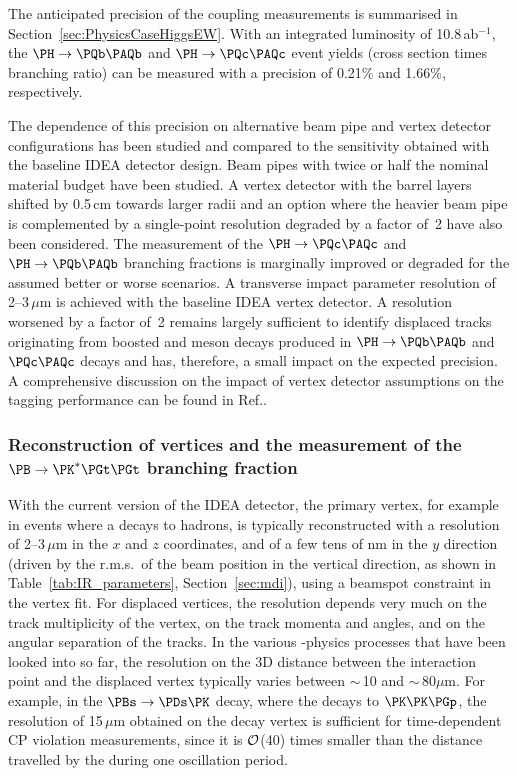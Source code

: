 The anticipated precision of the coupling measurements is summarised in Section~\ref{sec:PhysicsCaseHiggsEW}. 
With an integrated luminosity of 10.8\,ab$^{-1}$, the $\PH \to \PQb\PAQb$ and $\PH \to \PQc\PAQc$ event yields 
(cross section times branching ratio) 
can be measured with a precision of 0.21\% and 1.66\%, respectively.

The dependence of this precision on alternative beam pipe and vertex detector configurations 
has been studied and compared to the sensitivity obtained with the baseline IDEA detector design. 
Beam pipes with twice or half the nominal material budget have been studied. 
A vertex detector with the barrel layers shifted by 0.5\,cm towards larger radii 
and an option where the heavier beam pipe is complemented by a single-point resolution degraded by a factor of~2 
have also been considered. 
The measurement of the $\PH \to \PQc\PAQc$ and $\PH \to \PQb\PAQb$ branching fractions is marginally improved or degraded for the assumed better or worse scenarios. 
A transverse impact parameter resolution of \mbox{2--3}\,$\mu$m is achieved with the baseline IDEA vertex detector. 
A resolution worsened by a factor of~2 remains largely sufficient to identify displaced tracks 
originating from boosted \PD and \PB meson decays produced in $\PH \to \PQb\PAQb$ and $\PQc \PAQc$ decays 
and has, therefore, a small impact on the expected precision. 
A comprehensive discussion on the impact of vertex detector assumptions on the tagging performance can be found in Ref.\cite{sciandra_2024_gt813-z8602}.

\subsubsection{Reconstruction of vertices and the measurement of the 
\texorpdfstring{$\PB \to \PK^* \PGt\PGt$}{B to K* tau tau} branching fraction}
\label{sec:DetReq_vertex}

With the current version of the IDEA detector, the primary vertex, for example in events where a \PZ decays to hadrons, 
is typically reconstructed with a resolution of 2--3\,$\mu$m in the $x$ and $z$ coordinates, 
and of a few tens of nm in the $y$ direction 
(driven by the r.m.s.\ of the beam position in the vertical direction, 
as shown in Table~\ref{tab:IR_parameters}, Section~\ref{sec:mdi}), 
using a beamspot constraint in the vertex fit. 
For displaced vertices, the resolution depends very much on the track multiplicity of the vertex, on the track momenta and angles, and on the angular separation of the tracks. 
In the various \PB-physics processes that have been looked into so far, 
the resolution on the 3D distance between the interaction point and the displaced vertex typically varies between $\sim$\,10 and $\sim$\,80$\mu$m. 
For example, in the $\PBs \to \PDs \PK$ decay, where the \PDs decays to $\PK\PK\PGp$, 
the resolution of 15\,$\mu$m obtained on the \PBs decay vertex is sufficient for time-dependent CP violation measurements, 
since it is ${\cal{O}}$(40) times smaller than the distance travelled by the \PBs during one oscillation period. 

